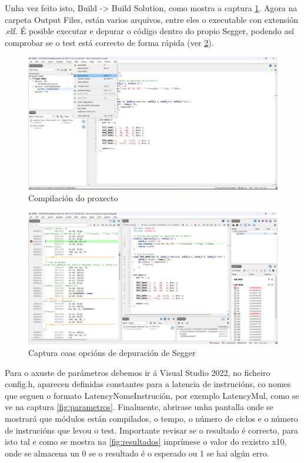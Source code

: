  Unha vez feito isto,  Build -> Build Solution, como mostra a captura \ref{fig:compilar}. Agora na carpeta Output Files, están varios arquivos, entre eles o executable con extensión .elf. É posible executar e depurar o código dentro do propio Segger, podendo así comprobar se o test está correcto de forma rápida (ver \ref{fig:cap3}).

\begin{figure}[hp!]
  \centering
  \includegraphics[width=\textwidth]{imaxes/Cap_3_Comp.png}
  \caption{Compilación do proxecto}
  \label{fig:compilar}
\end{figure}

\begin{figure}[hp!]
  \centering
  \includegraphics[width=\textwidth]{imaxes/Cap_4_Debug.png}
  \caption{Captura coas opcións de depuración de Segger}
  \label{fig:cap3}
\end{figure}

Para o axuste de parámetros debemos ir á Visual Studio 2022, no ficheiro config.h, aparecen definidas constantes para a latencia de instrucións, co nomes que seguen o formato LatencyNomeInstrución, por exemplo LatencyMul, como se ve na captura \ref{fig:parametros}. Finalmente, abrirase unha pantalla onde se mostrará que módulos están compilados, o tempo, o número de ciclos e o número de instrucións que levou o test. Importante revisar se o resultado é correcto, para isto tal e como se mostra na \ref{fig:resultados} imprímese o valor do rexistro x10, onde se almacena un 0 se o resultado é o esperado ou 1 se hai algún erro.

